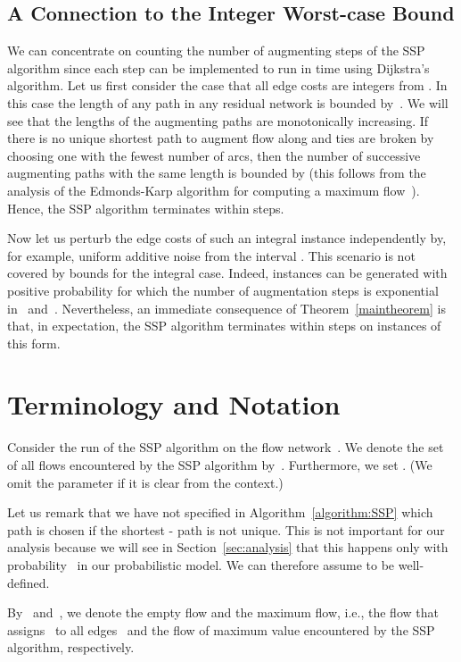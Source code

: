 \documentclass[11pt]{article}
\begin{document}
\subsection{A Connection to the Integer Worst-case Bound}

We can concentrate on counting the number of augmenting steps of the SSP algorithm since each step can be implemented to run in time  using Dijkstra's algorithm. Let us first consider the case that all edge costs are integers from . In this case the length of any path in any residual network is bounded by~. We will see that the lengths of the augmenting paths are monotonically increasing. If there is no unique shortest path to augment flow along and ties are broken by choosing one with the fewest number of arcs, then the number of successive augmenting paths with the same length is bounded by 
(this follows from the analysis of the Edmonds-Karp algorithm for computing a maximum flow~\cite{CLRS}).
 Hence, the SSP algorithm terminates within  steps.

Now let us perturb the edge costs of such an integral instance independently by, for example, uniform additive noise from the interval .
This scenario is not covered by bounds for the integral case. Indeed, instances can be generated with positive probability for which the number of augmentation
steps is exponential in~ and~. Nevertheless, an immediate consequence of Theorem~\ref{maintheorem} is that, in expectation, the SSP
algorithm terminates within  steps on instances of this form.

\section{Terminology and Notation}

Consider the run of the SSP algorithm on the flow network~. We denote the set  of all flows encountered by the SSP algorithm by~. Furthermore, we set .
(We omit the parameter  if it is clear from the context.)

Let us remark that we have not specified in Algorithm~\ref{algorithm:SSP} which path is chosen if the shortest - path is not unique. This is not important for our analysis because we will see in Section~\ref{sec:analysis} that this happens only with probability~ in our probabilistic model. We can therefore assume  to be well-defined.

By~ and~, we denote the empty flow and the maximum flow, i.e., the flow that assigns~ to all edges~ and the flow of maximum value encountered by the SSP algorithm, respectively.
\end{document}
